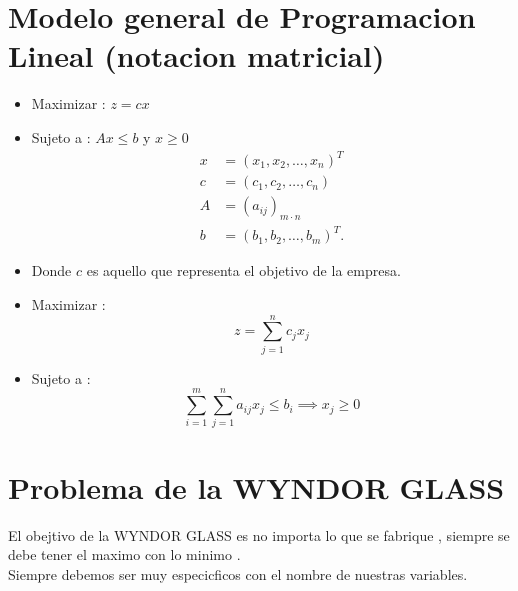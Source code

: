 \documentclass{article}
\begin{document}
    \section*{Modelo general de Programacion Lineal (notacion matricial)}
    \begin{itemize}
        \item Maximizar : \( z = cx \)
        \item Sujeto a : \( Ax \le b \) y \( x \ge 0 \)
            \begin{align*}
                x &= \left( x_1, x_2,\ldots,x_n \right)^T \\
                c &= \left( c_1 , c_2, \ldots , c_n \right) \\
                A &= (a_{ij})_{m\cdot n} \\
                b &= \left( b_1, b_2 , \ldots , b_m \right)^T
            .\end{align*}
    \item Donde \( c \) es aquello que representa el objetivo de la empresa.
    \item Maximizar :
        \[
        z = \sum_{j = 1}^{n} c_j x_j
    \] 
\item Sujeto a :
    \[
        \sum_{i = 1}^{m} \sum_{j = 1}^{n}    a_{ij} x_{j} \le  b_i \implies x_j \ge 0
    \] 
    \end{itemize}
    \section*{Problema de la WYNDOR GLASS } 
    El obejtivo de la WYNDOR GLASS es no importa lo que se fabrique , 
siempre se debe tener el maximo con lo minimo .\\
Siempre debemos ser muy especicficos con el nombre de nuestras variables.\\
\end{document}
